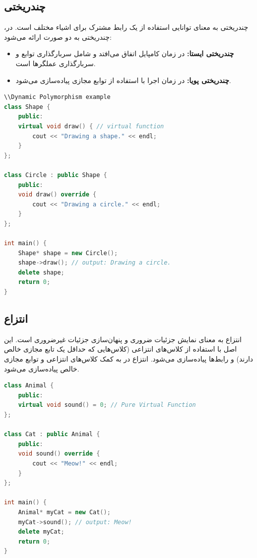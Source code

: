 \documentclass[12pt, a4paper]{report}
\begin{document}
\subsection{چندریختی}
چندریختی به معنای توانایی استفاده از یک رابط مشترک برای اشیاء مختلف است. در، چندریختی به دو صورت ارائه می‌شود:
\begin{itemize}
	\item \textbf{چندریختی ایستا:} در زمان کامپایل اتفاق می‌افتد و شامل سربارگذاری توابع  و سربارگذاری عملگرها  است.
	\item \textbf{چندریختی پویا:} در زمان اجرا با استفاده از توابع مجازی پیاده‌سازی می‌شود.
\end{itemize}
\LTR
\begin{lstlisting}[language=C++, breaklines=true]
\\Dynamic Polymorphism example
class Shape {
	public:
	virtual void draw() { // virtual function
		cout << "Drawing a shape." << endl;
	}
};

class Circle : public Shape {
	public:
	void draw() override {
		cout << "Drawing a circle." << endl;
	}
};

int main() {
	Shape* shape = new Circle();
	shape->draw(); // output: Drawing a circle.
	delete shape;
	return 0;
}

\end{lstlisting}
\RTL
\subsection{ انتزاع}
انتزاع به معنای نمایش جزئیات ضروری و پنهان‌سازی جزئیات غیرضروری است. این اصل با استفاده از کلاس‌های انتزاعی (کلاس‌هایی که حداقل یک تابع مجازی خالص دارند) و رابط‌ها پیاده‌سازی می‌شود.
انتزاع در  به کمک کلاس‌های انتزاعی و توابع مجازی خالص  پیاده‌سازی می‌شود.
\LTR
\begin{lstlisting}[language=C++, breaklines=true]
class Animal {
	public:
	virtual void sound() = 0; // Pure Virtual Function
};

class Cat : public Animal {
	public:
	void sound() override {
		cout << "Meow!" << endl;
	}
};

int main() {
	Animal* myCat = new Cat();
	myCat->sound(); // output: Meow!
	delete myCat;
	return 0;
}

\end{lstlisting}
\RTL
\end{document}
